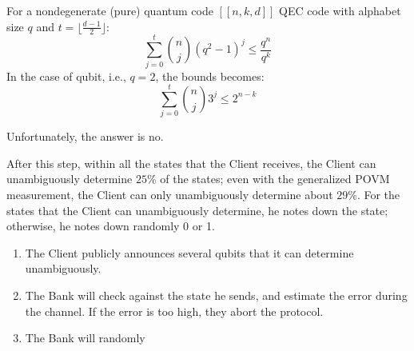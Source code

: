 \begin{theorem}
    For a nondegenerate (pure) quantum code $[[n, k, d]]$ QEC code with alphabet size $q$ and $t=\lfloor\frac{d-1}{2}\rfloor$:
    \begin{equation}
        \sum_{j=0}^t\binom{n}{j} \left(q^2-1\right)^j\le \frac{q^n}{q^k}
    \end{equation}
    In the case of qubit, i.e., $q=2$, the bounds becomes:
    \begin{equation}
        \sum_{j=0}^t\binom{n}{j} 3^j\le 2^{n-k}
    \end{equation}
\end{theorem}

Unfortunately, the answer is no. 







After this step, within all the states that the Client receives, the Client can unambiguously determine $25\%$ of the states; even with the generalized POVM measurement, the Client can only unambiguously determine about $29\%$. For the states that the Client can unambiguously determine, he notes down the state; otherwise, he notes down randomly 0 or 1.

\begin{enumerate}
    \item The Client publicly announces several qubits that it can determine unambiguously.

    \item The Bank will check against the state he sends, and estimate the error during the channel. If the error is too high, they abort the protocol.

    \item The Bank will randomly
\end{enumerate}




